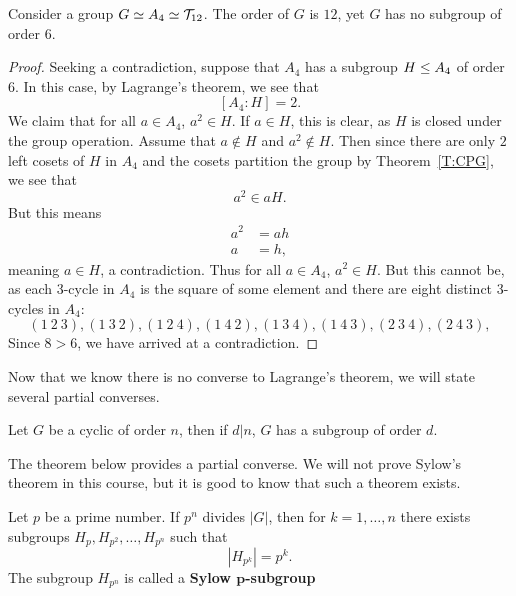 \documentclass{ximera}
\begin{document}
\begin{theorem}
  Consider a group $G\simeq A_4\simeq \mathcal{T}_{12}$. The order of $G$
  is $12$, yet $G$ has no subgroup of order $6$.
  \begin{proof}
    Seeking a contradiction, suppose that $A_4$ has a subgroup
    $H\leq A_4$ of order $6$. In this case, by Lagrange's theorem, we
    see that
    \[
    [A_4:H] = 2.
    \]
    We claim that for all $a\in A_4$, $a^2\in H$. If $a\in H$, this is
    clear, as $H$ is closed under the group operation. Assume that
    $a\notin H$ and $a^2\notin H$. Then since there are only $2$ left
    cosets of $H$ in $A_4$ and the cosets partition the group by
    Theorem~\ref{T:CPG}, we see that
    \[
    a^2\in aH.
    \]
    But this means
    \begin{align*}
      a^2 &= ah\\
      a   &= h,
    \end{align*}
    meaning $a\in H$, a contradiction. Thus for all $a\in A_4$,
    $a^2\in H$. But this cannot be, as each $3$-cycle in $A_4$ is the
    square of some element and there are eight distinct $3$-cycles in
    $A_4$:
    \[
    (1\ 2\ 3), (1\ 3\ 2), (1\ 2\ 4), (1\ 4\ 2),
    (1\ 3\ 4), (1\ 4\ 3), (2\ 3\ 4), (2\ 4\ 3),
    \]
    Since $8>6$, we have arrived at a contradiction.
  \end{proof}
\end{theorem}

Now that we know there is no converse to Lagrange's theorem, we will
state several partial converses.


\begin{exercise}
  Let $G$ be a cyclic of order $n$, then if $d|n$, $G$ has a subgroup
  of order $d$.
\end{exercise}




The theorem below provides a partial converse. We will not prove
Sylow's theorem in this course, but it is good to know that such a
theorem exists.

\begin{theorem}
  Let $p$ be a prime number. If $p^n$ divides $|G|$, then for $k =
  1,\dots, n$ there exists subgroups $H_p, H_{p^2},\dots,H_{p^n}$ such
  that
  \[
  |H_{p^k}| = p^k.
  \]
  The subgroup $H_{p^n}$ is called a \textbf{Sylow
    $\boldsymbol{p}$-subgroup}
\end{theorem}
\end{document}

